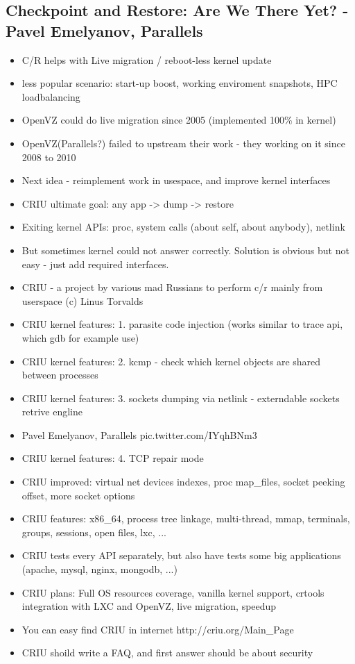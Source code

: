 \documentclass[10pt]{article}
\begin{document}
{\subsection{Checkpoint and Restore: Are We There Yet? - Pavel Emelyanov, Parallels}
\begin{itemize}
\item C/R helps with Live migration / reboot-less kernel update
\item less popular scenario: start-up boost, working enviroment snapshots, HPC loadbalancing
\item OpenVZ could do live migration since 2005 (implemented 100\% in kernel)
\item OpenVZ(Parallels?) failed to upstream their work - they working on it since 2008 to 2010
\item Next idea - reimplement work in usespace, and improve kernel interfaces
\item CRIU ultimate goal: any app -> dump -> restore
\item Exiting kernel APIs: proc, system calls (about self, about anybody), netlink
\item But sometimes kernel could not answer correctly. Solution is obvious but not easy - just add required interfaces.
\item CRIU - a project by various mad Russians to perform c/r mainly from userspace (c) Linus Torvalds
\item CRIU kernel features: 1. parasite code injection (works similar to trace api, which gdb for example use)
\item CRIU kernel features: 2. kcmp - check which kernel objects are shared between processes
\item CRIU kernel features: 3. sockets dumping via netlink - externdable sockets retrive engline
\item Pavel Emelyanov, Parallels pic.twitter.com/IYqhBNm3
\item CRIU kernel features: 4. TCP repair mode
\item CRIU improved: virtual net devices indexes, proc map\_files, socket peeking offset, more socket options
\item CRIU features: x86\_64, process tree linkage, multi-thread, mmap, terminals, groups, sessions, open files, lxc, ...
\item CRIU tests every API separately, but also have tests some big applications (apache, mysql, nginx, mongodb, ...)
\item CRIU plans: Full OS resources coverage, vanilla kernel support, crtools integration with LXC and OpenVZ, live migration, speedup
\item You can easy find CRIU in internet http://criu.org/Main\_Page 
\item CRIU shoild write a FAQ, and first answer should be about security
\end{itemize}

}
\end{document}
